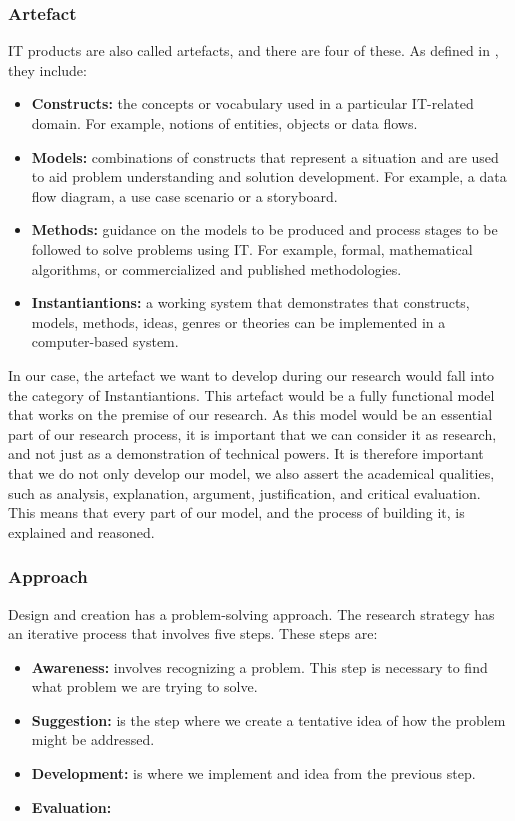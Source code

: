 \subsubsection{Artefact}
IT products are also called artefacts, and there are four of these. As defined in \cite{article-march1995}, they include:

\begin{itemize}
    \item \textbf{Constructs:} the concepts or vocabulary used in a particular IT-related domain. For example, notions of entities, objects or data flows.
    \item \textbf{Models:} combinations of constructs that represent a situation and are used to aid problem understanding and solution development. For example, a data flow diagram, a use case scenario or a storyboard.
    \item \textbf{Methods:} guidance on the models to be produced and process stages to be followed to solve problems using IT. For example, formal, mathematical algorithms, or commercialized and published methodologies.
    \item \textbf{Instantiantions:} a working system that demonstrates that constructs, models, methods, ideas, genres or theories can be implemented in a computer-based system.
\end{itemize}

In our case, the artefact we want to develop during our research would fall into the category of Instantiantions. This artefact would be a fully functional model that works on the premise of our research. As this model would be an essential part of our research process, it is important that we can consider it as research, and not just as a demonstration of technical powers. It is therefore important that we do not only develop our model, we also assert the academical qualities, such as analysis, explanation, argument, justification, and critical evaluation. This means that every part of our model, and the process of building it, is explained and reasoned.

\subsubsection{Approach}
\label{methodology-design-and-creation-approach}
Design and creation has a problem-solving approach. The research strategy has an iterative process that involves five steps. These steps are:

\begin{itemize}
    \item \textbf{Awareness:} involves recognizing a problem. This step is necessary to find what problem we are trying to solve.
    \item \textbf{Suggestion:} is the step where we create a tentative idea of how the problem might be addressed.
    \item \textbf{Development:} is where we implement and idea from the previous step.
    \item \textbf{Evaluation:} 
\end{itemize}

